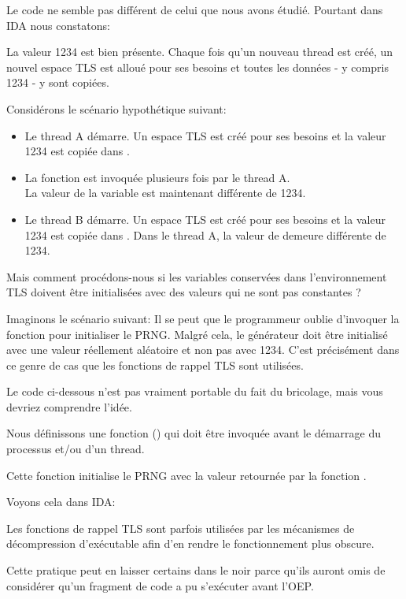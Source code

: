Le code ne semble pas différent de celui que nous avons étudié. Pourtant dans IDA nous constatons:



La valeur 1234 est bien présente. Chaque fois qu'un nouveau thread est créé, un nouvel espace \ac{TLS}
est alloué pour ses besoins et toutes les données - y compris 1234 - y sont copiées.

Considérons le scénario hypothétique suivant:

\begin{itemize}
\item Le thread A démarre. Un espace \ac{TLS} est créé pour ses besoins et la valeur 1234 est copiée
dans .

\item La fonction  est invoquée plusieurs fois par le thread A.\\
La valeur de la variable  est maintenant différente de 1234.

\item Le thread B démarre. Un espace \ac{TLS} est créé pour ses besoins et la valeur 1234 est copiée
dans . Dans le thread A, la valeur de  demeure différente de 1234.
\end{itemize}


Mais comment procédons-nous si les variables conservées dans l'environnement \ac{TLS} doivent être
initialisées avec des valeurs qui ne sont pas constantes ?

Imaginons le scénario suivant:
Il se peut que le programmeur oublie d'invoquer la fonction  pour initialiser le
\ac{PRNG}. Malgré cela, le générateur doit être initialisé avec une valeur réellement aléatoire et
non pas avec 1234. C'est précisément dans ce genre de cas que les fonctions de rappel \ac{TLS}
sont utilisées.

Le code ci-dessous n'est pas vraiment portable du fait du bricolage, mais vous devriez comprendre
l'idée.

Nous définissons une fonction () qui doit être invoquée avant le démarrage du
processus et/ou d'un thread.

Cette fonction initialise le \ac{PRNG} avec la valeur retournée par la fonction .



Voyons cela dans IDA:



Les fonctions de rappel TLS sont parfois utilisées par les mécanismes de décompression d'exécutable
afin d'en rendre le fonctionnement plus obscure.

Cette pratique peut en laisser certains dans le noir parce qu'ils auront omis de considérer qu'un
fragment de code a pu s'exécuter avant l'\ac{OEP}.
